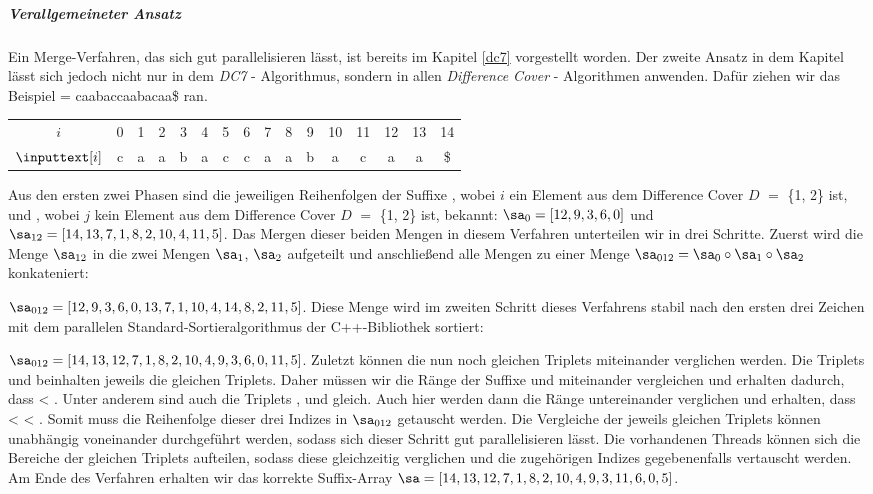 \subparagraph*{Verallgemeineter Ansatz}

Ein Merge-Verfahren, das sich gut parallelisieren lässt, ist bereits im Kapitel \ref{dc7} vorgestellt worden. Der zweite Ansatz in dem Kapitel lässt sich jedoch nicht nur in dem \emph{DC7} - Algorithmus, sondern in allen \emph{Difference Cover} - Algorithmen anwenden.
Dafür ziehen wir das Beispiel  = caabaccaabacaa\$ ran.

\begin{table}[H]
	\centering
	\begin{tabular}{c| c c c c c c c c c c c c c c c}
		$i$ & 0 & 1 & 2 & 3 & 4 & 5 & 6 & 7 & 8 & 9 & 10 & 11 & 12 & 13 & 14 \\
		$\inputtext[i]$ & c & a & a & b & a & c & c & a & a & b & a & c & a & a & \$
	\end{tabular}
\end{table}

Aus den ersten zwei Phasen sind die jeweiligen Reihenfolgen der Suffixe , wobei $i$ ein Element aus dem Difference Cover \(D\) $=$ \{1, 2\} ist, und , wobei $j$ kein Element aus dem Difference Cover \(D\) $=$ \{1, 2\} ist, bekannt:
$\sa_{0} = [12, 9, 3, 6, 0]$ und $\sa_{12} = [14, 13, 7, 1, 8, 2, 10, 4, 11, 5]$.
Das Mergen dieser beiden Mengen in diesem Verfahren unterteilen wir in drei Schritte. Zuerst wird die Menge $\sa_{12}$ in die zwei Mengen $\sa_1$, $\sa_2$ aufgeteilt und anschließend alle Mengen zu einer Menge $\sa_{012} = \sa_0 \circ \sa_1 \circ \sa_2$ konkateniert:

$\sa_{012} = [12, 9, 3, 6, 0, 13, 7, 1, 10, 4, 14, 8, 2, 11, 5]$.
Diese Menge wird im zweiten Schritt dieses Verfahrens stabil nach den ersten drei Zeichen mit dem pa\-ral\-lel\-en Standard-Sortieralgorithmus der C++-Bibliothek sortiert:

$\sa_{012} = [14, 13, 12, 7, 1, 8, 2, 10, 4, 9, 3, 6, 0, 11, 5]$. Zuletzt können die nun noch gleichen Triplets miteinander verglichen werden. Die Triplets  und  beinhalten jeweils die gleichen Triplets. Daher müssen wir die Ränge der Suffixe  und  miteinander vergleichen und erhalten dadurch, dass  < . Unter anderem sind auch die Triplets ,  und  gleich. Auch hier werden dann die Ränge untereinander verglichen und erhalten, dass  <  < . Somit muss die Reihenfolge dieser drei Indizes in $\sa_{012}$ getauscht werden. Die Vergleiche der jeweils gleichen Triplets können unabhängig voneinander durchgeführt werden, sodass sich dieser Schritt gut parallelisieren lässt. Die vorhandenen Threads können sich die Bereiche der gleichen Triplets aufteilen, sodass diese gleichzeitig verglichen und die zugehörigen Indizes gegebenenfalls vertauscht werden. Am Ende des Verfahren erhalten wir das korrekte Suffix-Array $\sa = [14, 13, 12, 7, 1, 8, 2, 10, 4, 9, 3, 11, 6, 0, 5]$.